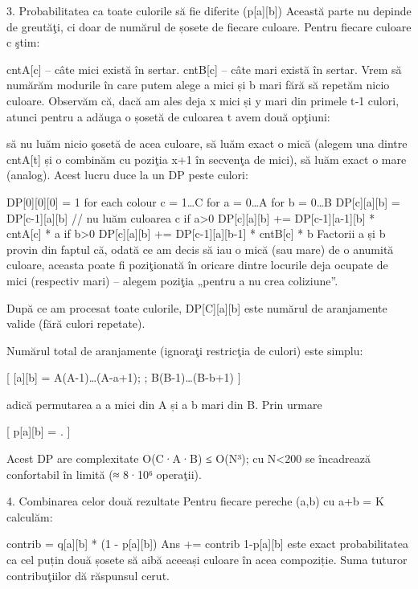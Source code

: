3. Probabilitatea ca toate culorile să fie diferite (p[a][b])
Această parte nu depinde de greutăţi, ci doar de numărul de șosete de fiecare culoare.
Pentru fiecare culoare c ştim:

cntA[c] – câte mici există în sertar.
cntB[c] – câte mari există în sertar.
Vrem să numărăm modurile în care putem alege a mici și b mari fără să repetăm nicio culoare.
Observăm că, dacă am ales deja x mici și y mari din primele t‑1 culori, atunci pentru a adăuga o șosetă de culoarea t avem două opţiuni:

să nu luăm nicio şosetă de acea culoare,
să luăm exact o mică (alegem una dintre cntA[t] și o combinăm cu poziţia x+1 în secvenţa de mici),
să luăm exact o mare (analog).
Acest lucru duce la un DP peste culori:

DP[0][0][0] = 1
for each colour c = 1…C
   for a = 0…A
      for b = 0…B
          DP[c][a][b] = DP[c-1][a][b]                     // nu luăm culoarea c
          if a>0  DP[c][a][b] += DP[c-1][a-1][b] * cntA[c] * a
          if b>0  DP[c][a][b] += DP[c-1][a][b-1] * cntB[c] * b
Factorii a și b provin din faptul că, odată ce am decis să iau o mică (sau mare) de o anumită culoare, aceasta poate fi poziţionată în oricare dintre locurile deja ocupate de mici (respectiv mari) – alegem poziţia „pentru a nu crea coliziune”.

După ce am procesat toate culorile, DP[C][a][b] este numărul de aranjamente valide (fără culori repetate).

Numărul total de aranjamente (ignoraţi restricţia de culori) este simplu:

[ [a][b] = A\cdot (A-1)\dots (A-a+1); \times; B\cdot (B-1)\dots (B-b+1) ]

adică permutarea a a mici din A și a b mari din B.
Prin urmare

[ p[a][b] =  . ]

Acest DP are complexitate O(C·A·B) ≤ O(N³); cu N<200 se încadrează confortabil în limită (≈ 8·10⁶ operaţii).

4. Combinarea celor două rezultate
Pentru fiecare pereche (a,b) cu a+b = K calculăm:

contrib = q[a][b] * (1 - p[a][b])
Ans    += contrib
1-p[a][b] este exact probabilitatea ca cel puțin două șosete să aibă aceeași culoare în acea compoziție.
Suma tuturor contribuţiilor dă răspunsul cerut.

